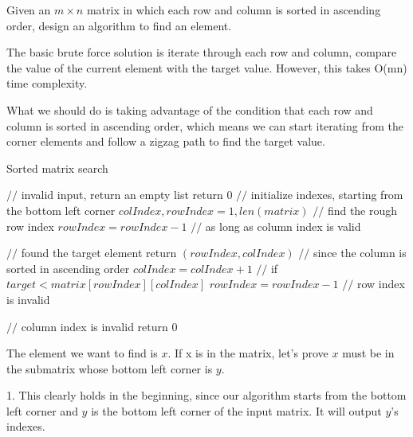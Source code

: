 \newpage
{} %

\problemdes

Given an $m \times n$ matrix in which each row and column is sorted in ascending order, design an algorithm to find an element.

\solution


The basic brute force solution is iterate through each row and column, compare the value of the current element with the target value. However, this takes O(mn) time complexity. 

What we should do is taking advantage of the condition that each row and column is sorted in ascending order, which means we can start iterating from the corner elements and follow a zigzag path to find the target value. 


\begin{algorithm}
  \caption{Sorted matrix search}
  {
  	$//$ invalid input, return an empty list\;
  	return $0$\;
  }
  $//$ initialize indexes, starting from the bottom left corner\;
  $colIndex, rowIndex = 1, len(matrix)$\;
  $//$ find the rough row index\;
  {
  	$rowIndex = rowIndex-1$\;
  }
  $//$ as long as column index is valid\;
  {
    {
       $//$ found the target element\;
       return $(rowIndex, colIndex)$\;
     }
    {
    	$//$ since the column is sorted in ascending order\;
    	$colIndex = colIndex+1$\;
     }
     $//$ if $target < matrix[rowIndex][colIndex]$\;
     {
     	$rowIndex = rowIndex-1$\;
     }
     $//$ row index is invalid\;
     
     $//$ column index is invalid\;
     return $0$\;
}
\end{algorithm}


The element we want to find is $x$. If x is in the matrix, let's prove $x$ must be in the submatrix whose bottom left corner is $y$.

1. This clearly holds in the beginning, since our algorithm starts from the bottom left corner and $y$ is the bottom left corner of the input matrix. It will output $y$'s indexes.

